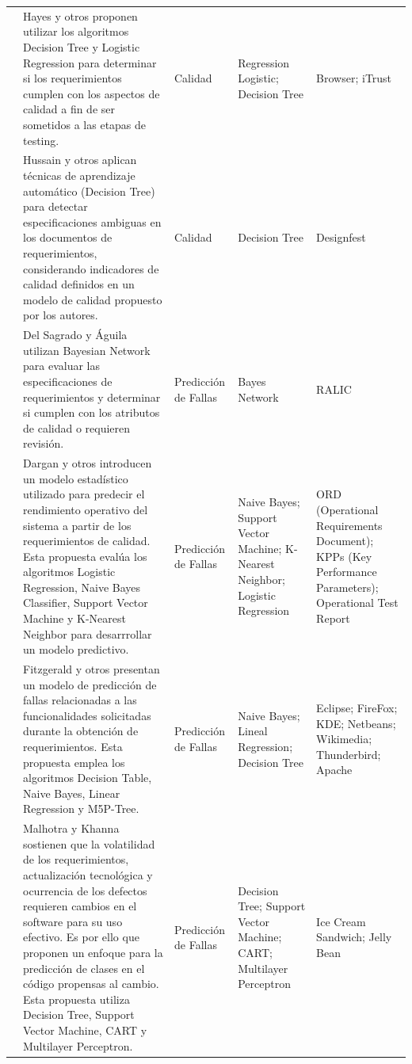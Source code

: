 \documentclass[journal]{IEEEtran}
\begin{document}
\begin{longtable}[c]{p{0.50cm}p{4.5cm}p{2.5cm}p{3cm}p{2.5cm}}
\cite{Hayes2015} & Hayes y otros proponen utilizar los algoritmos Decision Tree y Logistic Regression para determinar si los requerimientos cumplen con los aspectos de calidad a fin de ser sometidos a las etapas de testing. & Calidad & Regression Logistic; Decision Tree & Browser; iTrust \\ \cline{1-5}

\cite{Hussain2007} & Hussain y otros aplican técnicas de aprendizaje automático (Decision Tree) para detectar especificaciones ambiguas en los documentos de requerimientos, considerando indicadores de calidad definidos en un modelo de calidad propuesto por los autores. & Calidad & Decision Tree & Designfest \\ \cline{1-5}

\cite{del2017stability} & Del Sagrado y Águila utilizan Bayesian Network para evaluar las especificaciones de requerimientos y determinar si cumplen con los atributos de calidad o requieren revisión. & Predicción de Fallas & Bayes Network & RALIC \\ \cline{1-5}

\cite{dargan2016systems} & Dargan y otros introducen un modelo estadístico utilizado para predecir el rendimiento operativo del sistema a partir de los requerimientos de calidad.  Esta propuesta evalúa los algoritmos Logistic Regression, Naive Bayes Classifier, Support Vector Machine y K-Nearest Neighbor para desarrrollar un modelo predictivo. & Predicción de Fallas & Naive Bayes; Support Vector Machine; K- Nearest Neighbor; Logistic Regression & ORD (Operational Requirements Document); KPPs (Key Performance Parameters); Operational Test Report \\ \cline{1-5}

\cite{fitzgerald2012early} & Fitzgerald y otros presentan un modelo de predicción de fallas relacionadas a las funcionalidades solicitadas durante la obtención de requerimientos. Esta propuesta emplea los algoritmos Decision Table, Naive Bayes, Linear Regression y M5P-Tree. & Predicción de Fallas & Naive Bayes; Lineal Regression; Decision Tree  & Eclipse; FireFox; KDE; Netbeans; Wikimedia; Thunderbird; Apache \\ \cline{1-5}

\cite{malhotra2017exploratory} & Malhotra y Khanna sostienen que la volatilidad de los requerimientos, actualización tecnológica y ocurrencia de los defectos requieren cambios en el software para su uso efectivo. Es por ello que proponen un enfoque para la predicción de clases en el código propensas al cambio. Esta propuesta utiliza Decision Tree, Support Vector Machine, CART y Multilayer Perceptron. & Predicción de Fallas  & Decision Tree; Support Vector Machine; CART; Multilayer Perceptron & Ice Cream Sandwich; Jelly Bean \\ \cline{1-5}


\end{longtable}
\end{document}
